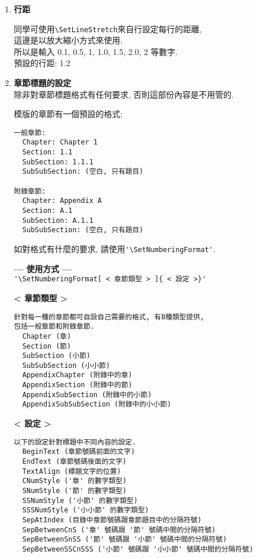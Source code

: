 \begin{enumerate}
  \item
  {
    \textbf{行距}

    同學可使用\verb|\SetLineStretch|來自行設定每行的距離,\\
    這邊是以放大縮小方式來使用.\\
    所以是輸入 0.1, 0.5, 1, 1.0, 1.5, 2.0, 2 等數字.\\
    預設的行距: 1.2
  } %

  \newpage
  \item
  {
    \textbf{章節標題的設定}\\
    除非對章節標題格式有任何要求, 否則這部份內容是不用管的.

    模版的章節有一個預設的格式:
    \begin{DescriptionFrame}
    \begin{verbatim}
一般章節:
  Chapter: Chapter 1
  Section: 1.1
  SubSection: 1.1.1
  SubSubSection: (空白, 只有題目)

附錄章節:
  Chapter: Appendix A
  Section: A.1
  SubSection: A.1.1
  SubSubSection: (空白, 只有題目)
    \end{verbatim}
    \end{DescriptionFrame}

    如對格式有什麼的要求, 請使用\verb|'\SetNumberingFormat'|.

    \textbf{--- 使用方式 ---}\\
    \verb|'\SetNumberingFormat[ < 章節類型 > ]{ < 設定 >}'|

    \textbf{< 章節類型 >}
    \begin{DescriptionFrame}
    \begin{verbatim}
針對每一種的章節都可自設自己需要的格式, 有8種類型提供,
包括一般章節和附錄章節.
  Chapter (章)
  Section (節)
  SubSection (小節)
  SubSubSection (小小節)
  AppendixChapter (附錄中的章)
  AppendixSection (附錄中的節)
  AppendixSubSection (附錄中的小節)
  AppendixSubSubSection (附錄中的小小節)
    \end{verbatim}
    \end{DescriptionFrame}

  \newpage
    \textbf{< 設定 >}
    \begin{DescriptionFrame}
    \begin{verbatim}
以下的設定針對標題中不同內容的設定.
  BeginText (章節號碼前面的文字)
  EndText (章節號碼後面的文字)
  TextAlign (標題文字的位置)
  CNumStyle ('章' 的數字類型)
  SNumStyle ('節' 的數字類型)
  SSNumStyle ('小節' 的數字類型)
  SSSNumStyle ('小小節' 的數字類型)
  SepAtIndex (目錄中章節號碼跟章節題目中的分隔符號)
  SepBetweenCnS ('章' 號碼跟 '節' 號碼中間的分隔符號)
  SepBetweenSnSS ('節' 號碼跟 '小節' 號碼中間的分隔符號)
  SepBetweenSSCnSSS ('小節' 號碼跟 '小小節' 號碼中間的分隔符號)
    \end{verbatim}
    \end{DescriptionFrame}

}
\end{enumerate}
